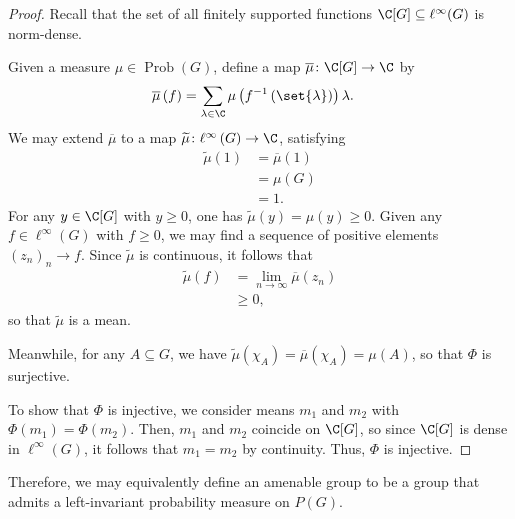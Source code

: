 \documentclass[10pt]{mypackage}
\begin{document}
\begin{proof}
  Recall that the set of all finitely supported functions $\C[G]\subseteq \ell^{\infty}(G)$ is norm-dense.

  Given a measure $\mu\in \operatorname{Prob}\left( G \right)$, define a map $ \overline{\mu}\colon \C[G]\rightarrow \C $ by
  \begin{align*}
    \overline{\mu}\left( f \right) &= \sum_{\lambda\in \C} \mu\left( f^{-1}\left( \set{\lambda} \right) \right)\lambda.
  \end{align*}
  We may extend $ \overline{\mu} $ to a map $ \widetilde{\mu}\colon \ell^{\infty}\left( G \right)\rightarrow \C $, satisfying
  \begin{align*}
    \widetilde{\mu}\left( 1 \right) &= \overline{\mu}\left( 1 \right)\\
                                    &= \mu\left( G \right)\\
                                    &= 1.
  \end{align*}
  For any $y\in \C[G]$ with $y\geq 0$, one has $ \widetilde{\mu}\left( y \right) = \mu\left( y \right)\geq 0 $. Given any $f\in \ell^{\infty}\left( G \right)$ with $f\geq 0$, we may find a sequence of positive elements $\left( z_n \right)_n\rightarrow f$. Since $ \widetilde{\mu} $ is continuous, it follows that
  \begin{align*}
    \widetilde{\mu}\left( f \right) &= \lim_{n\rightarrow\infty} \overline{\mu}\left( z_n \right)\\
                                    &\geq 0,
  \end{align*}
  so that $ \widetilde{\mu} $ is a mean.

  Meanwhile, for any $A\subseteq G$, we have $ \widetilde{\mu}\left( \chi_A \right) = \overline{\mu}\left( \chi_A \right) = \mu(A) $, so that $\Phi$ is surjective.

  To show that $\Phi$ is injective, we consider means $m_1$ and $m_2$ with $\Phi\left( m_1 \right) = \Phi\left( m_2 \right)$. Then, $m_1$ and $m_2$ coincide on $\C[G]$, so since $\C[G]$ is dense in $\ell^{\infty}\left( G \right)$, it follows that $m_1 = m_2$ by continuity. Thus, $\Phi$ is injective.
\end{proof}
Therefore, we may equivalently define an amenable group to be a group that admits a left-invariant probability measure on $P(G)$.
\end{document}
